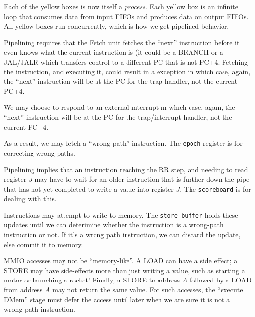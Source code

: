 \begin{tightlist}

  \item Each of the yellow boxes is now itself a \emph{process}.  Each
    yellow box is an infinite loop that consumes data from input FIFOs
    and produces data on output FIFOs.  All yellow boxes run
    concurrently, which is how we get pipelined behavior.

  \item Pipelining requires that the Fetch unit fetches the ``next''
    instruction before it even knows what the current instruction is
    (it could be a BRANCH or a JAL/JALR which transfers control to a
    different PC that is not PC+4.  Fetching the instruction, and
    executing it, could result in a exception in which case, again,
    the ``next'' instruction will be at the PC for the trap handler,
    not the current PC+4.

    We may choose to respond to an external interrupt in which case,
    again, the ``next'' instruction will be at the PC for the
    trap/interrupt handler, not the current PC+4.

    As a result, we may fetch a ``wrong-path'' instruction. The
    \verb|epoch| register is for correcting wrong paths.

  \item Pipelining implies that an instruction reaching the RR step,
    and needing to read register $J$ may have to wait for an older
    instruction that is further down the pipe that has not yet
    completed to write a value into register $J$.  The
    \verb|scoreboard| is for dealing with this.

  \item Instructions may attempt to write to memory. The {\tt store
    buffer} holds these updates until we can deterimine whether the
    instruction is a wrong-path instruction or not.  If it's a wrong
    path instruction, we can discard the update, else commit it to
    memory.

  \item MMIO accesses may not be ``memory-like''.  A LOAD can have a
  side effect; a STORE may have side-effects more than just writing a
  value, such as starting a motor or launching a rocket!  Finally, a
  STORE to address $A$ followed by a LOAD from address $A$ may not
  return the same value.  For such accesses, the ``execute DMem''
  stage must defer the access until later when we are sure it is not a
  wrong-path instruction.

\end{tightlist}

